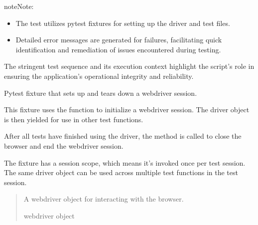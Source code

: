 \documentclass[letterpaper,10pt,english]{sphinxmanual}
\begin{document}
\begin{sphinxadmonition}{note}{Note:}\begin{itemize}
\item {} 
\sphinxAtStartPar
The test utilizes pytest fixtures for setting up the driver and test files.

\item {} 
\sphinxAtStartPar
Detailed error messages are generated for failures, facilitating quick identification and remediation of issues encountered during testing.

\end{itemize}
\end{sphinxadmonition}

\sphinxAtStartPar
The stringent test sequence and its execution context highlight the script’s role in ensuring the application’s operational integrity and reliability.

\begin{fulllineitems}
\label{\detokenize{file_management_cycle:file_management_cycle.driver}}
\pysigstartsignatures
{}
\pysigstopsignatures
\sphinxAtStartPar
Pytest fixture that sets up and tears down a webdriver session.

\sphinxAtStartPar
This fixture uses the  function to initialize a webdriver session. 
The driver object is then yielded for use in other test functions.

\sphinxAtStartPar
After all tests have finished using the driver, the  method is called to 
close the browser and end the webdriver session.

\sphinxAtStartPar
The fixture has a session scope, which means it’s invoked once per test session. 
The same driver object can be used across multiple test functions in the test session.
\begin{quote}\begin{description}
\sphinxAtStartPar
A webdriver object for interacting with the browser.

\sphinxAtStartPar
webdriver object

\end{description}\end{quote}

\end{fulllineitems}
\end{document}
